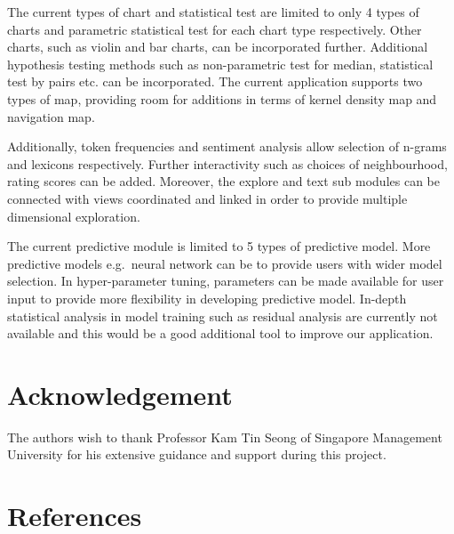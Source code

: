 \documentclass{acm_proc_article-sp}
\begin{document}
The current types of chart and statistical test are limited to only 4
types of charts and parametric statistical test for each chart type
respectively. Other charts, such as violin and bar charts, can be
incorporated further. Additional hypothesis testing methods such as
non-parametric test for median, statistical test by pairs etc. can be
incorporated. The current application supports two types of map,
providing room for additions in terms of kernel density map and
navigation map.

Additionally, token frequencies and sentiment analysis allow selection
of n-grams and lexicons respectively. Further interactivity such as
choices of neighbourhood, rating scores can be added. Moreover, the
explore and text sub modules can be connected with views coordinated and
linked in order to provide multiple dimensional exploration.

The current predictive module is limited to 5 types of predictive model.
More predictive models e.g.~neural network can be to provide users with
wider model selection. In hyper-parameter tuning, parameters can be made
available for user input to provide more flexibility in developing
predictive model. In-depth statistical analysis in model training such
as residual analysis are currently not available and this would be a
good additional tool to improve our application.

\hypertarget{acknowledgement}{%
\section{Acknowledgement}\label{acknowledgement}}

The authors wish to thank Professor Kam Tin Seong of Singapore
Management University for his extensive guidance and support during this
project.

\hypertarget{references}{%
\section*{References}\label{references}}
\end{document}
